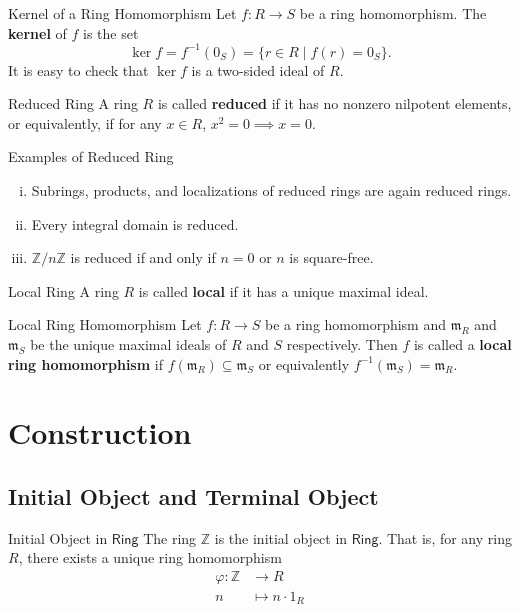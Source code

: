 \begin{definition}{Kernel of a Ring Homomorphism}{}
    Let $f:R\to S$ be a ring homomorphism. The \textbf{kernel} of $f$ is the set
    \[
        \ker f=f^{-1}(0_S)=\{r\in R\mid f(r)=0_S\}.
    \]
    It is easy to check that $\ker f$ is a two-sided ideal of $R$.
\end{definition}


\begin{definition}{Reduced Ring}{}
    A ring $R$ is called \textbf{reduced} if it has no nonzero nilpotent elements, or equivalently, if for any $x\in R$, $x^2=0\implies x=0$.
\end{definition}


\begin{proposition}{Examples of Reduced Ring}{}
    \begin{enumerate}[(i)]
        \item Subrings, products, and localizations of reduced rings are again reduced rings.
        \item Every integral domain is reduced.
        \item $\mathbb{Z}/n\mathbb{Z}$ is reduced if and only if $n=0$ or $n$ is square-free.
    \end{enumerate}
\end{proposition}


\begin{definition}{Local Ring}{}
    A ring $R$ is called \textbf{local} if it has a unique maximal ideal.
\end{definition}

\begin{definition}{Local Ring Homomorphism}{}
    Let $f:R\to S$ be a ring homomorphism and $\mathfrak{m}_R$ and $\mathfrak{m}_S$ be the unique maximal ideals of $R$ and $S$ respectively. Then $f$ is called a \textbf{local ring homomorphism} if $f(\mathfrak{m}_R)\subseteq \mathfrak{m}_S$ or equivalently $f^{-1}(\mathfrak{m}_S)=\mathfrak{m}_R$.
\end{definition}

\section{Construction}
\subsection{Initial Object and Terminal Object}
\begin{proposition}{Initial Object in $\mathsf{Ring}$}{}
    The ring $\mathbb{Z}$ is the initial object in $\mathsf{Ring}$. That is, for any ring $R$, there exists a unique ring homomorphism
    \begin{align*}
        \varphi:\mathbb{Z}&\longrightarrow R\\
        n&\longmapsto n\cdot 1_R
    \end{align*}
\end{proposition}

